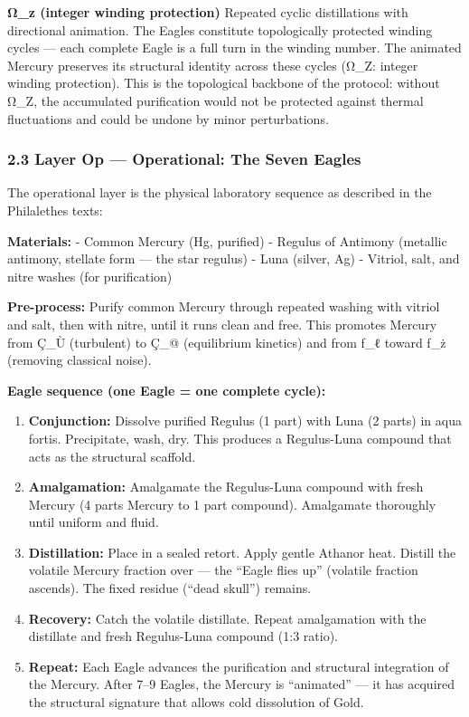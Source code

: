 \documentclass[
  11pt,
  a4paper,
]{article}
\begin{document}
\textbf{Ω\_z (integer winding protection)} Repeated cyclic distillations
with directional animation. The Eagles constitute topologically
protected winding cycles --- each complete Eagle is a full turn in the
winding number. The animated Mercury preserves its structural identity
across these cycles (Ω\_Z: integer winding protection). This is the
topological backbone of the protocol: without Ω\_Z, the accumulated
purification would not be protected against thermal fluctuations and
could be undone by minor perturbations.

\subsubsection{2.3 Layer Op --- Operational: The Seven
Eagles}\label{layer-op-operational-the-seven-eagles}

The operational layer is the physical laboratory sequence as described
in the Philalethes texts:

\textbf{Materials:} - Common Mercury (Hg, purified) - Regulus of
Antimony (metallic antimony, stellate form --- the star regulus) - Luna
(silver, Ag) - Vitriol, salt, and nitre washes (for purification)

\textbf{Pre-process:} Purify common Mercury through repeated washing
with vitriol and salt, then with nitre, until it runs clean and free.
This promotes Mercury from Ç\_Ù (turbulent) to Ç\_@ (equilibrium
kinetics) and from ƒ\_ℓ toward ƒ\_ż (removing classical noise).

\textbf{Eagle sequence (one Eagle = one complete cycle):}

\begin{enumerate}
\def\labelenumi{\arabic{enumi}.}
\item
  \textbf{Conjunction:} Dissolve purified Regulus (1 part) with Luna (2
  parts) in aqua fortis. Precipitate, wash, dry. This produces a
  Regulus-Luna compound that acts as the structural scaffold.
\item
  \textbf{Amalgamation:} Amalgamate the Regulus-Luna compound with fresh
  Mercury (4 parts Mercury to 1 part compound). Amalgamate thoroughly
  until uniform and fluid.
\item
  \textbf{Distillation:} Place in a sealed retort. Apply gentle Athanor
  heat. Distill the volatile Mercury fraction over --- the ``Eagle flies
  up'' (volatile fraction ascends). The fixed residue (``dead skull'')
  remains.
\item
  \textbf{Recovery:} Catch the volatile distillate. Repeat amalgamation
  with the distillate and fresh Regulus-Luna compound (1:3 ratio).
\item
  \textbf{Repeat:} Each Eagle advances the purification and structural
  integration of the Mercury. After 7--9 Eagles, the Mercury is
  ``animated'' --- it has acquired the structural signature that allows
  cold dissolution of Gold.
\end{enumerate}
\end{document}

